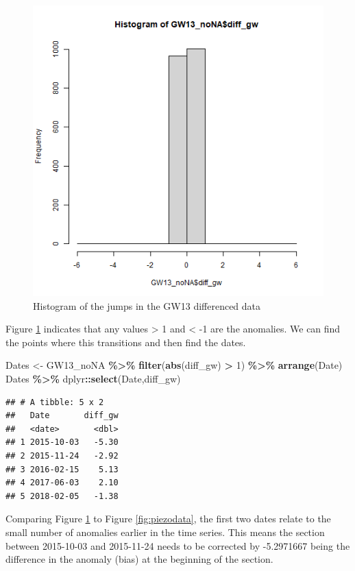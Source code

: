 \documentclass[
]{article}
\newenvironment{Shaded}{\begin{snugshade}}{\end{snugshade}}
\newcommand{\DecValTok}[1]{\textcolor[rgb]{0.00,0.00,0.81}{#1}}
\newcommand{\FunctionTok}[1]{\textcolor[rgb]{0.13,0.29,0.53}{\textbf{#1}}}
\newcommand{\NormalTok}[1]{#1}
\newcommand{\OtherTok}[1]{\textcolor[rgb]{0.56,0.35,0.01}{#1}}
\newcommand{\SpecialCharTok}[1]{\textcolor[rgb]{0.81,0.36,0.00}{\textbf{#1}}}
\begin{document}
\begin{figure}
\includegraphics[width=0.8\linewidth]{../Figures/HistogramGW13_difference} \caption{Histogram of the jumps in the GW13 differenced data}\label{fig:hist-jumps-GW13}
\end{figure}

Figure \ref{fig:hist-jumps-GW13} indicates that any values
\textgreater{} 1 and \textless{} -1 are the anomalies. We can find the
points where this transitions and then find the dates.

\begin{Shaded}
\begin{Highlighting}[]
\NormalTok{Dates }\OtherTok{\textless{}{-}}\NormalTok{ GW13\_noNA }\SpecialCharTok{\%\textgreater{}\%}
  \FunctionTok{filter}\NormalTok{(}\FunctionTok{abs}\NormalTok{(diff\_gw) }\SpecialCharTok{\textgreater{}} \DecValTok{1}\NormalTok{) }\SpecialCharTok{\%\textgreater{}\%}
  \FunctionTok{arrange}\NormalTok{(Date)}
\NormalTok{Dates }\SpecialCharTok{\%\textgreater{}\%}
\NormalTok{  dplyr}\SpecialCharTok{::}\FunctionTok{select}\NormalTok{(Date,diff\_gw)}
\end{Highlighting}
\end{Shaded}

\begin{verbatim}
## # A tibble: 5 x 2
##   Date       diff_gw
##   <date>       <dbl>
## 1 2015-10-03   -5.30
## 2 2015-11-24   -2.92
## 3 2016-02-15    5.13
## 4 2017-06-03    2.10
## 5 2018-02-05   -1.38
\end{verbatim}

Comparing Figure \ref{fig:hist-jumps-GW13} to Figure
\ref{fig:piezodata}, the first two dates relate to the small number of
anomalies earlier in the time series. This means the section between
2015-10-03 and 2015-11-24 needs to be corrected by -5.2971667 being the
difference in the anomaly (bias) at the beginning of the section.
\end{document}
